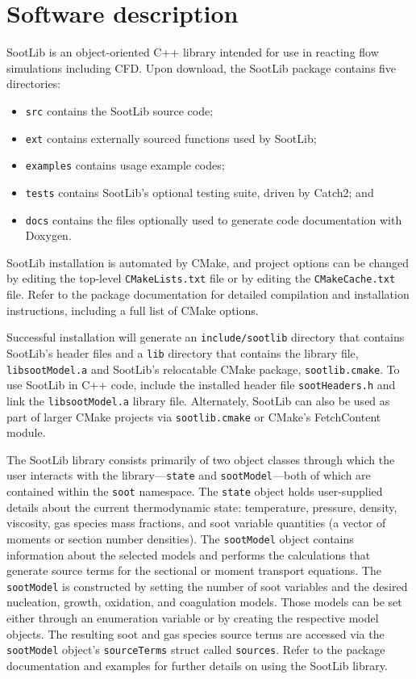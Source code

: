 \documentclass[preprint,letterpaper]{elsarticle}
\begin{document}

\section{Software description}
\label{s:architecture}

SootLib is an object-oriented C++ library intended for use in reacting flow simulations including CFD.
Upon download, the SootLib package contains five directories: 
%
\begin{itemize}
    \item \texttt{src} contains the SootLib source code; 
    \item \texttt{ext} contains externally sourced functions used by SootLib; 
    \item \texttt{examples} contains usage example codes; 
    \item \texttt{tests} contains SootLib's optional testing suite, driven by Catch2; and 
    \item \texttt{docs} contains the files optionally used to generate code documentation with Doxygen.
\end{itemize}
%
SootLib installation is automated by CMake, and project options can be changed by editing the top-level \texttt{CMakeLists.txt} file or by editing the \texttt{CMakeCache.txt} file. Refer to the package documentation for detailed compilation and installation instructions, including a full list of CMake options.

Successful installation will generate an \texttt{include/sootlib} directory that contains SootLib's header files and a \texttt{lib} directory that contains the library file, \texttt{libsootModel.a} and SootLib's relocatable CMake package, \texttt{sootlib.cmake}.
To use SootLib in C++ code, include the installed header file \texttt{sootHeaders.h} and link the \texttt{libsootModel.a} library file. Alternately, SootLib can also be used as part of larger CMake projects via \texttt{sootlib.cmake} or CMake's FetchContent module.

The SootLib library consists primarily of two object classes through which the user interacts with the library---\texttt{state} and \texttt{sootModel}---both of which are contained within the \texttt{soot} namespace. The \texttt{state} object holds user-supplied details about the current thermodynamic state: temperature, pressure, density, viscosity, gas species mass fractions, and soot variable quantities (a vector of moments or section number densities). The \texttt{sootModel} object contains information about the selected models and performs the calculations that generate source terms for the sectional or moment transport equations. The \texttt{sootModel} is constructed by setting the number of soot variables and the desired nucleation, growth, oxidation, and coagulation models. Those models can be set either through an enumeration variable or by creating the respective model objects.
The resulting soot and gas species source terms are accessed via the \texttt{sootModel} object's \texttt{sourceTerms} struct called \texttt{sources}. Refer to the package documentation and examples for further details on using the SootLib library.
\end{document}
